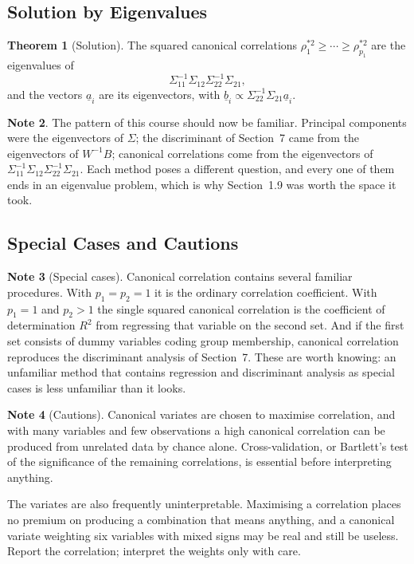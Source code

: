 \documentclass[11pt,a4paper]{article}
\theoremstyle{definition}
\newtheorem{thm}{Theorem}[section]
\newtheorem{note}[thm]{Note}
\begin{document}
\subsection{Solution by Eigenvalues}
\begin{thm}[Solution]
\label{thm:cancorr}
The squared canonical correlations $\rho_1^{*2}\geq\cdots\geq\rho_{p_1}^{*2}$
are the eigenvalues of
$$\Sigma_{11}^{-1}\Sigma_{12}\Sigma_{22}^{-1}\Sigma_{21},$$
and the vectors $\underline{a}_i$ are its eigenvectors, with
$\underline{b}_i \propto \Sigma_{22}^{-1}\Sigma_{21}\underline{a}_i$.
\end{thm}

\begin{note}
The pattern of this course should now be familiar. Principal components were the
eigenvectors of $\Sigma$; the discriminant of Section~7 came from the
eigenvectors of $W^{-1}B$; canonical correlations come from the eigenvectors of
$\Sigma_{11}^{-1}\Sigma_{12}\Sigma_{22}^{-1}\Sigma_{21}$. Each method poses a
different question, and every one of them ends in an eigenvalue problem, which
is why Section~1.9 was worth the space it took.
\end{note}

\subsection{Special Cases and Cautions}
\begin{note}[Special cases]
Canonical correlation contains several familiar procedures. With $p_1=p_2=1$ it
is the ordinary correlation coefficient. With $p_1=1$ and $p_2>1$ the single
squared canonical correlation is the coefficient of determination $R^{2}$ from
regressing that variable on the second set. And if the first set consists of
dummy variables coding group membership, canonical correlation reproduces the
discriminant analysis of Section~7. These are worth knowing: an unfamiliar
method that contains regression and discriminant analysis as special cases is
less unfamiliar than it looks.
\end{note}

\begin{note}[Cautions]
Canonical variates are chosen to maximise correlation, and with many variables
and few observations a high canonical correlation can be produced from
unrelated data by chance alone. Cross-validation, or Bartlett's test of the
significance of the remaining correlations, is essential before interpreting
anything.

The variates are also frequently uninterpretable. Maximising a correlation
places no premium on producing a combination that means anything, and a
canonical variate weighting six variables with mixed signs may be real and still
be useless. Report the correlation; interpret the weights only with care.
\end{note}
\end{document}
